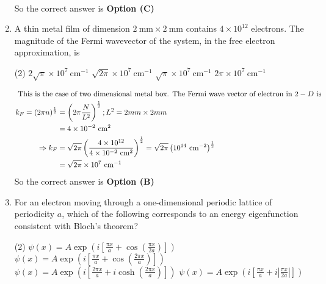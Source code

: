 \begin{enumerate}
\begin{answer}
\begin{align*}
		\end{align*}
		So the correct answer is \textbf{Option (C)}
	\end{answer}
	\item A thin metal film of dimension $2 \mathrm{~mm} \times 2 \mathrm{~mm}$ contains $4 \times 10^{12}$ electrons. The magnitude of the Fermi wavevector of the system, in the free electron approximation, is 
	{}
	\begin{tasks}(2)
		\task[\textbf{A.}] $2 \sqrt{\pi} \times 10^{7} \mathrm{~cm}^{-1}$
		\task[\textbf{B.}] $\sqrt{2 \pi} \times 10^{7} \mathrm{~cm}^{-1}$
		\task[\textbf{C.}] $\sqrt{\pi} \times 10^{7} \mathrm{~cm}^{-1}$
		\task[\textbf{D.}] $2 \pi \times 10^{7} \mathrm{~cm}^{-1}$
	\end{tasks}
	\begin{answer}
		\begin{align*}
		\intertext{ This is the case of two dimensional metal box. The Fermi wave vector of electron in $2-D$ is}
		k_{F}=(2 \pi n)^{\frac{1}{2}}&=\left(2 \pi \frac{N}{L^{2}}\right)^{\frac{1}{2}} ; L^{2}=2 m m \times 2 m m\\&=4 \times 10^{-2} \mathrm{~cm}^{2}\\
		\Rightarrow k_{F}&=\sqrt{2 \pi}\left(\frac{4 \times 10^{12}}{4 \times 10^{-2} \mathrm{~cm}^{2}}\right)^{\frac{1}{2}}=\sqrt{2 \pi}\left(10^{14} \mathrm{~cm}^{-2}\right)^{\frac{1}{2}}\\&=\sqrt{2 \pi} \times 10^{7} \mathrm{~cm}^{-1}
		\end{align*}
		So the correct answer is \textbf{Option (B)}
	\end{answer}
	\item For an electron moving through a one-dimensional periodic lattice of periodicity $a$, which of the following corresponds to an energy eigenfunction consistent with Bloch's theorem?
	{}
	\begin{tasks}(2)
		\task[\textbf{A.}] $\psi(x)=A \exp \left(i\left[\frac{\pi x}{a}+\cos \left(\frac{\pi x}{2 a}\right)\right]\right)$
		\task[\textbf{B.}] $\psi(x)=A \exp \left(i\left[\frac{\pi x}{a}+\cos \left(\frac{2 \pi x}{a}\right)\right]\right)$
		\task[\textbf{C.}] $\psi(x)=A \exp \left(i\left[\frac{2 \pi x}{a}+i \cosh \left(\frac{2 \pi x}{a}\right)\right]\right)$
		\task[\textbf{D.}] $\psi(x)=A \exp \left(i\left[\frac{\pi x}{a}+i\left|\frac{\pi x}{2 a}\right|\right]\right)$
	\end{tasks}
	\begin{answer}
		\begin{align*}

\end{align*}
\end{answer}
\end{enumerate}
